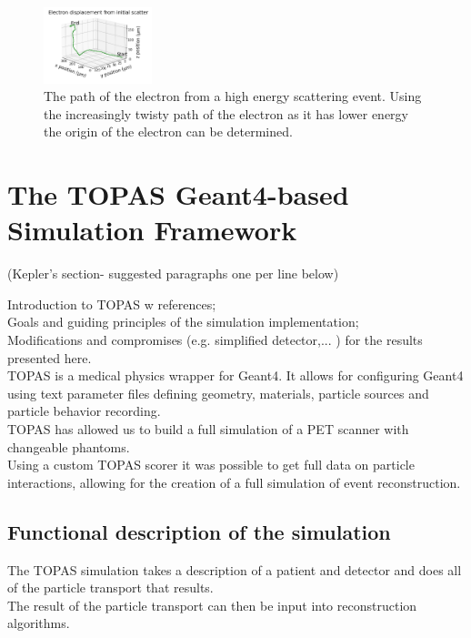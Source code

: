 \documentclass[12pt]{article}
\begin{document}
\begin{figure}[ht]
	\centering
	\includegraphics[angle=0,width=0.28\textwidth]{Figures/electron-scatter-figure-v1a.png}
	\caption{The path of the electron from a high energy scattering event. Using the increasingly twisty path of the electron as it has lower energy the origin of the electron can be determined.}
	\label{fig:Electron_Path}
\end{figure}

\section{The TOPAS Geant4-based Simulation Framework}
\label{TOPAS}
(Kepler's section- suggested paragraphs one per line below)

Introduction to TOPAS w references;\\
Goals and guiding principles of the simulation implementation;\\
Modifications and compromises (e.g. simplified detector,... ) for the results presented here.\\

TOPAS is a medical physics wrapper for Geant4. It allows for configuring Geant4 using text parameter files defining geometry, materials, particle sources and particle behavior recording. \\
TOPAS has allowed us to build a full simulation of a PET scanner with changeable phantoms. \\
Using a custom TOPAS scorer it was possible to get full data on particle interactions, allowing for the creation of a full simulation of event reconstruction. \\

\subsection{Functional description of the simulation}

The TOPAS simulation takes a description of a patient and detector and does all of the particle transport that results.\\
The result of the particle transport can then be input into reconstruction algorithms.
\end{document}
